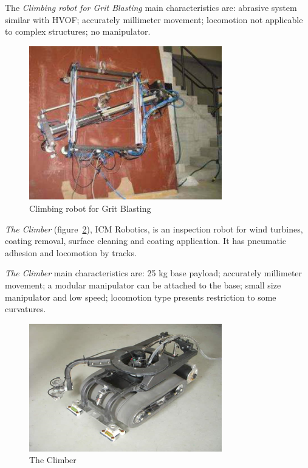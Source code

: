 The \emph{Climbing robot for Grit Blasting} main characteristics are:
abrasive system similar with HVOF; accurately
millimeter movement; locomotion not applicable to complex structures; no
manipulator.

\begin{figure}[ht]
\centering
\includegraphics[width=8.4cm]{figs/climbers/grit.png}
\caption{Climbing robot for Grit Blasting}
\label{grit}
\end{figure}


\emph{The Climber} (figure~\ref{icm}), ICM Robotics, is an inspection robot for
wind turbines, coating removal, surface cleaning and coating application.
It has pneumatic adhesion and locomotion by tracks.

\emph{The Climber} main characteristics are: 25 kg base payload; accurately
millimeter movement; a modular manipulator can be attached to the base; small
size manipulator and low speed; locomotion type presents restriction to
some curvatures.

\begin{figure}[ht]
\centering
\includegraphics[width=8.4cm]{figs/climbers/icm.png}
\caption{The Climber}
\label{icm}
\end{figure}

